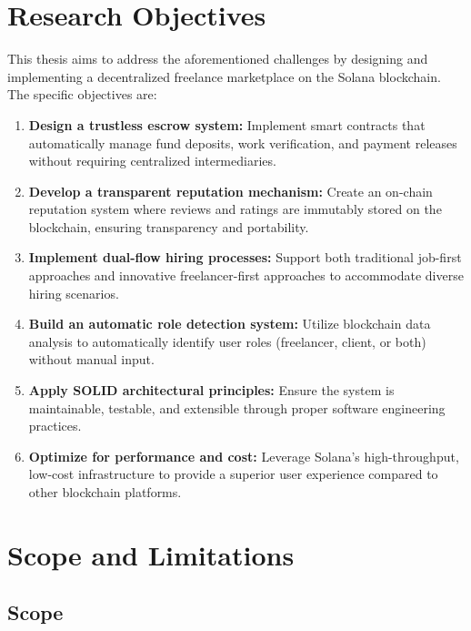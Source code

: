 \documentclass[a4paper,13pt,twoside]{report}
\theoremstyle{definition}
\begin{document}
\section{Research Objectives}

This thesis aims to address the aforementioned challenges by designing and implementing a decentralized freelance marketplace on the Solana blockchain. The specific objectives are:

\begin{enumerate}
    \item \textbf{Design a trustless escrow system:} Implement smart contracts that automatically manage fund deposits, work verification, and payment releases without requiring centralized intermediaries.

    \item \textbf{Develop a transparent reputation mechanism:} Create an on-chain reputation system where reviews and ratings are immutably stored on the blockchain, ensuring transparency and portability.

    \item \textbf{Implement dual-flow hiring processes:} Support both traditional job-first approaches and innovative freelancer-first approaches to accommodate diverse hiring scenarios.

    \item \textbf{Build an automatic role detection system:} Utilize blockchain data analysis to automatically identify user roles (freelancer, client, or both) without manual input.

    \item \textbf{Apply SOLID architectural principles:} Ensure the system is maintainable, testable, and extensible through proper software engineering practices.

    \item \textbf{Optimize for performance and cost:} Leverage Solana's high-throughput, low-cost infrastructure to provide a superior user experience compared to other blockchain platforms.
\end{enumerate}

\section{Scope and Limitations}

\subsection{Scope}
\end{document}
